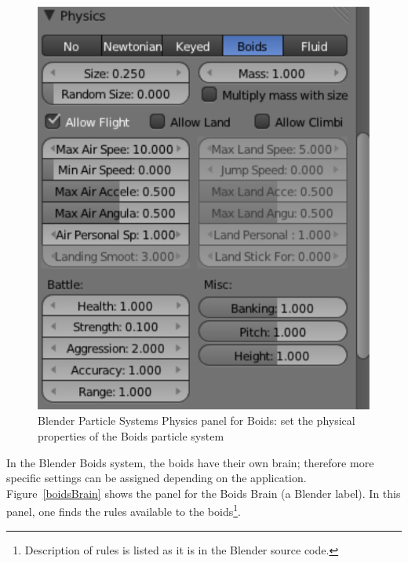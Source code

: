 \begin{figure}[htbp]
\begin{center}
\includegraphics[scale = 0.65]{figures/boidsPhysics.pdf} 
\caption{Blender Particle Systems Physics panel for Boids: set the physical properties of the Boids particle system}
\label{boidsPhysics}
\end{center}
\end{figure}

In the Blender Boids system, the boids have their own brain; therefore more specific settings can be assigned depending on the application. Figure~\ref{boidsBrain} shows the panel for the Boids Brain (a Blender label). In this panel, one finds the rules available to the boids\footnote{Description of rules is listed as it is in the Blender source code.}.

